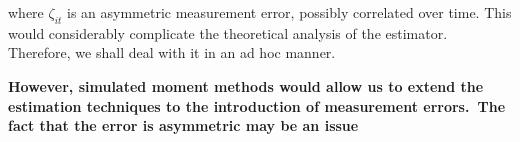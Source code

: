 \documentclass[a4paper,notitlepage,thmsb,11pt]{article}
\begin{document}
\bigskip 

where $\zeta _{it}$ is an asymmetric measurement error, possibly correlated
over time. This would considerably complicate the theoretical analysis of
the estimator. Therefore, we shall deal with it in an ad hoc manner.

\bigskip 

\bigskip 

\textbf{However, simulated moment methods would allow us to extend the
estimation techniques to the introduction of measurement errors.\ The fact
that the error is asymmetric may be an issue}

\bigskip 
\end{document}
